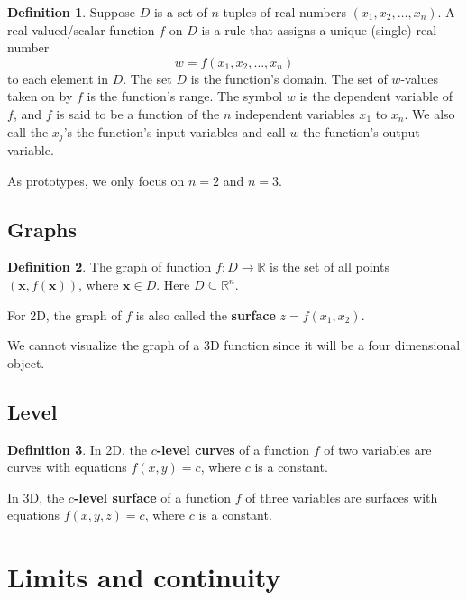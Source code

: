\documentclass[
]{book}
\theoremstyle{definition}
\newtheorem{definition}{Definition}[chapter]
\theoremstyle{definition}
\theoremstyle{definition}
\theoremstyle{definition}
\theoremstyle{remark}
\begin{document}
\begin{definition}
Suppose \(D\) is a set of \(n\)-tuples of real numbers \((x_1, x_2, \ldots, x_n)\).
A real-valued/scalar function \(f\) on \(D\) is a rule that assigns a unique (single) real
number
\[w = f(x_1, x_2, \ldots, x_n)\]
to each element in \(D\).
The set \(D\) is the function's domain. The set of \(w\)-values taken on by \(f\) is
the function's range. The symbol \(w\) is the dependent variable of \(f\), and \(f\)
is said to be a function of the \(n\) independent variables \(x_1\) to \(x_n\).
We also call the \(x_j\)'s the function's input variables and call \(w\) the function's output variable.
\end{definition}

As prototypes, we only focus on \(n=2\) and \(n=3\).

\subsection{Graphs}\label{graphs}

\begin{definition}
The graph of function \(f:D \to \mathbb{R}\) is the set of all points
\((\mathbf{x}, f(\mathbf{x}))\), where \(\mathbf{x}\in D\).
Here \(D\subseteq \mathbb{R}^n\).
\end{definition}

For 2D, the graph of \(f\) is also called the \textbf{surface} \(z = f(x_1,x_2)\).

We cannot visualize the graph of a 3D function since it will be a four dimensional object.

\subsection{Level}\label{level}

\begin{definition}
In 2D, the \textbf{\(c\)-level curves} of a function \(f\) of two variables are curves with equations
\(f(x,y) = c\), where \(c\) is a constant.

In 3D, the \textbf{\(c\)-level surface} of a function \(f\) of three variables are surfaces
with equations \(f(x,y,z) = c\), where \(c\) is a constant.
\end{definition}

\section{Limits and continuity}\label{limits-and-continuity}
\end{document}
